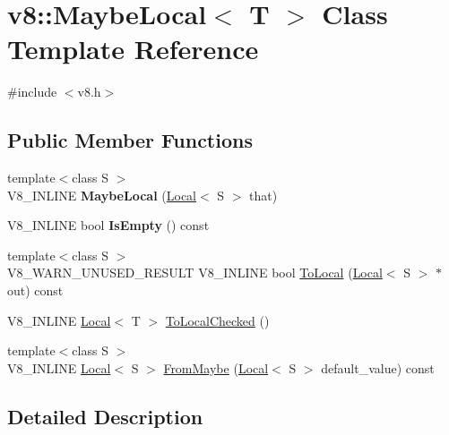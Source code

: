 \hypertarget{classv8_1_1MaybeLocal}{}\section{v8\+:\+:Maybe\+Local$<$ T $>$ Class Template Reference}
\label{classv8_1_1MaybeLocal}


{\ttfamily \#include $<$v8.\+h$>$}

\subsection*{Public Member Functions}
\begin{DoxyCompactItemize}
\item 
\mbox{\label{classv8_1_1MaybeLocal_ab488843c2faf4375517616d3c66886e5}} 
{\footnotesize template$<$class S $>$ }\\V8\+\_\+\+I\+N\+L\+I\+NE {\bfseries Maybe\+Local} (\mbox{\hyperlink{classv8_1_1Local}{Local}}$<$ S $>$ that)
\item 
\mbox{\label{classv8_1_1MaybeLocal_aa321cd3ec18e64d893bc14b21e4624f4}} 
V8\+\_\+\+I\+N\+L\+I\+NE bool {\bfseries Is\+Empty} () const
\item 
{\footnotesize template$<$class S $>$ }\\V8\+\_\+\+W\+A\+R\+N\+\_\+\+U\+N\+U\+S\+E\+D\+\_\+\+R\+E\+S\+U\+LT V8\+\_\+\+I\+N\+L\+I\+NE bool \mbox{\hyperlink{classv8_1_1MaybeLocal_aa12fc83adccbf02f502a2aaeed9c32ab}{To\+Local}} (\mbox{\hyperlink{classv8_1_1Local}{Local}}$<$ S $>$ $\ast$out) const
\item 
V8\+\_\+\+I\+N\+L\+I\+NE \mbox{\hyperlink{classv8_1_1Local}{Local}}$<$ T $>$ \mbox{\hyperlink{classv8_1_1MaybeLocal_a9b2c9d50fca5897e3a03fd4c25d12415}{To\+Local\+Checked}} ()
\item 
{\footnotesize template$<$class S $>$ }\\V8\+\_\+\+I\+N\+L\+I\+NE \mbox{\hyperlink{classv8_1_1Local}{Local}}$<$ S $>$ \mbox{\hyperlink{classv8_1_1MaybeLocal_ad99cb1e7ac1a4eac34c144faa4262407}{From\+Maybe}} (\mbox{\hyperlink{classv8_1_1Local}{Local}}$<$ S $>$ default\+\_\+value) const
\end{DoxyCompactItemize}


\subsection{Detailed Description}
